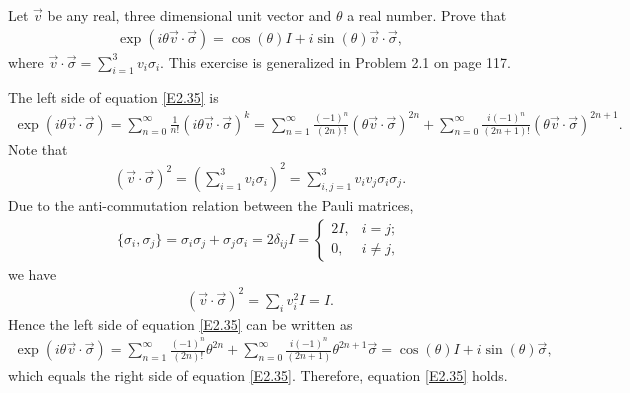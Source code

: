 \documentclass[en]{sol-man}
\begin{document}
\begin{exe}
    Let $\vec{v}$ be any real, three dimensional unit vector and $\theta$ a real number. Prove that
    \begin{align}
        \label{E2.35}
        \exp(i\theta\vec{v}\cdot\vec{\sigma})=\cos(\theta)I+i\sin(\theta)\vec{v}\cdot\vec{\sigma},
    \end{align}
    where $\vec{v}\cdot\vec{\sigma}=\sum_{i=1}^3v_i\sigma_i$. This exercise is generalized in Problem 2.1 on page 117.
\end{exe}
\begin{pf}
    The left side of equation \eqref{E2.35} is
    \begin{align}
        \exp(i\theta\vec{v}\cdot\vec{\sigma})=\sum_{n=0}^{\infty}\frac{1}{n!}(i\theta\vec{v}\cdot\vec{\sigma})^k=\sum_{n=1}^{\infty}\frac{(-1)^n}{(2n)!}(\theta\vec{v}\cdot\vec{\sigma})^{2n}+\sum_{n=0}^{\infty}\frac{i(-1)^n}{(2n+1)!}(\theta\vec{v}\cdot\vec{\sigma})^{2n+1}.
    \end{align}
    Note that
    \begin{align}
        (\vec{v}\cdot\vec{\sigma})^2=\left(\sum_{i=1}^3v_i\sigma_i\right)^2=\sum_{i,j=1}^3v_iv_j\sigma_i\sigma_j.
    \end{align}
    Due to the anti-commutation relation between the Pauli matrices,
    \begin{align}
        \{\sigma_i,\sigma_j\}=\sigma_i\sigma_j+\sigma_j\sigma_i=2\delta_{ij}I=\left\{\begin{array}{ll}
            2I,&i=j;\\
            0,&i\neq j,
        \end{array}\right.
    \end{align}
    we have
    \begin{align}
        (\vec{v}\cdot\vec{\sigma})^2=\sum_iv_i^2I=I.
    \end{align}
    Hence the left side of equation \eqref{E2.35} can be written as
    \begin{align}
        \exp(i\theta\vec{v}\cdot\vec{\sigma})=\sum_{n=1}^{\infty}\frac{(-1)^n}{(2n)!}\theta^{2n}+\sum_{n=0}^{\infty}\frac{i(-1)^n}{(2n+1)}\theta^{2n+1}\vec{\sigma}=\cos(\theta)I+i\sin(\theta)\vec{\sigma},
    \end{align}
    which equals the right side of equation \eqref{E2.35}. Therefore, equation \eqref{E2.35} holds.
\end{pf}
\end{document}
